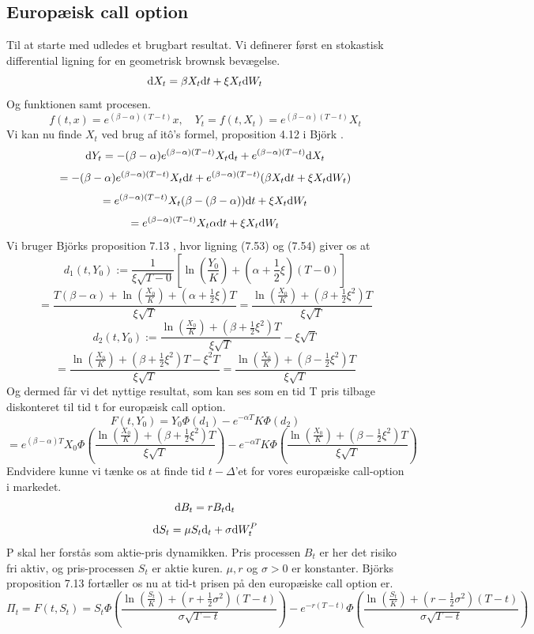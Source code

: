 \documentclass{article}
\theoremstyle{definition}
\theoremstyle{remark}
\begin{document}
\subsection{Europæisk call option}
Til at starte med udledes et brugbart resultat. Vi definerer først en stokastisk differential ligning for en geometrisk brownsk bevægelse.
$$\text d X_t = \beta X_t\text dt+\xi X_t \text dW_t$$
Og funktionen samt procesen.
$$f(t,x)=e^{(\beta-\alpha)(T-t)}x,\quad Y_t=f(t,X_t)=e^{(\beta-\alpha)(T-t)}X_t$$
Vi kan nu finde $X_t$ ved brug af itô's formel, proposition 4.12 i Björk \cite{Bjork2020}.
$$\text dY_t=-(\beta-\alpha)e^{(\beta-\alpha)(T-t)}X_t\text d_t+e^{(\beta-\alpha)(T-t)}\text dX_t$$
$$=-(\beta-\alpha)e^{(\beta-\alpha)(T-t)}X_t\text dt+e^{(\beta-\alpha)(T-t)}(\beta X_t\text dt+\xi X_t\text dW_t)$$
$$=e^{(\beta-\alpha)(T-t)}X_t(\beta-(\beta-\alpha))\text dt+\xi X_t\text dW_t$$
$$=e^{(\beta-\alpha)(T-t)}X_t\alpha\text dt+\xi X_t\text dW_t$$
Vi bruger Björks proposition 7.13 \cite{Bjork2020}, hvor ligning (7.53) og (7.54) giver os at
$$d_1(t,Y_0) :=\frac{1}{\xi\sqrt{T-0}}\left[\ln\left(\frac{Y_0}{K}\right)+(\alpha+\frac12\xi)(T-0) \right]$$
$$=\frac{T(\beta-\alpha)+\ln\left(\frac{X_0}{K}\right)+(\alpha+\frac12\xi)T}{\xi\sqrt T}=\frac{\ln\left(\frac{X_0}{K}\right)+(\beta+\frac12\xi^2)T}{\xi\sqrt T}$$
$$d_2(t,Y_0):=\frac{\ln\left(\frac{X_0}{K}\right)+(\beta+\frac12\xi^2)T}{\xi\sqrt T}-\xi\sqrt{T}$$
$$=\frac{\ln\left(\frac{X_0}{K}\right)+(\beta+\frac12\xi^2)T-\xi^2T}{\xi\sqrt T}=\frac{\ln\left(\frac{X_0}{K}\right)+(\beta-\frac12\xi^2)T}{\xi\sqrt T}$$
Og dermed får vi det nyttige resultat, som kan ses som en tid T pris tilbage diskonteret til tid t for europæisk call option.
$$F(t,Y_0)=Y_0\Phi(d_1)-e^{-\alpha T}K\Phi(d_2)$$
$$=e^{(\beta-\alpha)T}X_0\Phi\left(\frac{\ln\left(\frac{X_0}{K}\right)+(\beta+\frac12\xi^2)T}{\xi\sqrt T}\right)-e^{-\alpha T}K\Phi\left(\frac{\ln\left(\frac{X_0}{K}\right)+(\beta-\frac12\xi^2)T}{\xi\sqrt T}\right)$$
Endvidere kunne vi tænke os at finde tid $t-\Delta$'et for vores europæiske call-option i markedet.
$$\text dB_t = rB_t\text d_t$$
$$\text d S_t = \mu S_t\text d_t +\sigma \text dW_t^P$$
P skal her forstås som aktie-pris dynamikken. Pris processen $B_t$ er her det risiko fri aktiv, og pris-processen $S_t$ er aktie kuren. $\mu,r$ og $\sigma>0$ er konstanter. Björks proposition 7.13 \cite{Bjork2020} fortæller os nu at tid-t prisen på den europæiske call option er.
$$\Pi_t=F(t,S_t)=S_t\Phi\left(\frac{\ln\left(\frac{S_t}{K}\right)+(r+\frac12\sigma^2)(T-t)}{\sigma\sqrt{T-t}}\right)-e^{-r(T-t)}\Phi\left(\frac{\ln\left(\frac{S_t}{K}\right)+(r-\frac12\sigma^2)(T-t)}{\sigma\sqrt{T-t}}\right)$$
\end{document}
